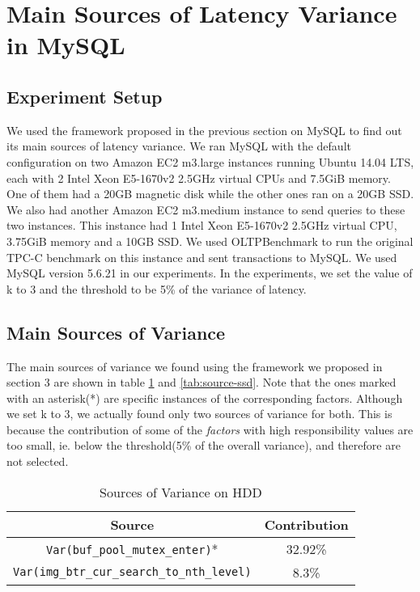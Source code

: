 
\section{Main Sources of Latency Variance in MySQL}

\subsection{Experiment Setup}
We used the framework proposed in the previous section on MySQL to find out its
main sources of latency variance. We ran MySQL with the default configuration
on two Amazon EC2 m3.large instances running Ubuntu 14.04 LTS, each with 2
Intel Xeon E5-1670v2 2.5GHz virtual CPUs and 7.5GiB memory. One of them had a
20GB magnetic disk while the other ones ran on a 20GB SSD. We also had another
Amazon EC2 m3.medium instance to send queries to these two instances. This
instance had 1 Intel Xeon E5-1670v2 2.5GHz virtual CPU, 3.75GiB memory and a
10GB SSD. We used OLTPBenchmark to run the original TPC-C benchmark on this
instance and sent transactions to MySQL. We used MySQL version 5.6.21 in our
experiments. In the experiments, we set the value of k to 3 and the threshold
to be 5\% of the variance of latency.

\subsection{Main Sources of Variance}
The main sources of variance we found using the framework we proposed in
section 3 are shown in table \ref{tab:source-hdd} and \ref{tab:source-ssd}.
Note that the ones marked with an asterisk(*) are specific instances of the
corresponding factors. Although we set k to 3, we actually found only two
sources of variance for both. This is because the contribution of some of
the \textit{factors} with high responsibility values are too small, ie.
below the threshold(5\% of the overall variance), and therefore are not
selected.

\begin{table}[h!]
\centering
\begin{tabular}{|c|c|} \hline
Source&Contribution\\ \hline
\texttt{Var(buf\_pool\_mutex\_enter)}*&32.92\%\\ \hline
\texttt{Var(img\_btr\_cur\_search\_to\_nth\_level)}&8.3\%\\
\hline\end{tabular}
\caption{Sources of Variance on HDD}
\label{tab:source-hdd}
\end{table}

